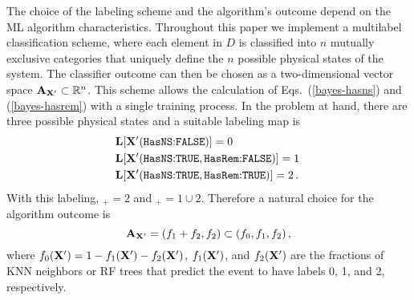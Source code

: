 The choice of the labeling scheme and the algorithm's outcome depend on the \ac{ML} algorithm characteristics. Throughout this paper we implement a multilabel classification scheme, where each
element in $D$ is classified into $n$ mutually exclusive categories that uniquely define the $n$ possible physical states of the system. The classifier outcome can then be chosen as a
two-dimensional vector space ${\bf A}_{{\bf X}'}\subset \mathbb{R}^n$. This scheme allows the calculation of Eqs.~(\ref{bayes-hasns}) and (\ref{bayes-hasrem}) with a single training process. In
the problem at hand, there are three possible physical states and a suitable labeling
map is 
%
\begin{align}
&{\bf L}[{\bf X}'(\hbox{{{\tt HasNS}}:{{\tt FALSE}}})]=0\,\nonumber\\
&{\bf L}[{\bf X}'(\hbox{{{\tt HasNS}}:{{\tt TRUE}}},\hbox{{{\tt HasRem}}:{{\tt FALSE}}})]=1\,\\
&{\bf L}[{\bf X}'(\hbox{{{\tt HasNS}}:{{\tt TRUE}}},\hbox{{{\tt HasRem}}:{{\tt TRUE}}})]=2\,.\nonumber
\end{align}
%
With this labeling, \hasrem$_+=2$ and \hasns$_+=1\cup 2$. Therefore a natural choice for the algorithm outcome is
%
\begin{equation}
{\bf A}_{\bf X'}=(f_1+f_2,f_2)\subset (f_0,f_1,f_2)\,,
\end{equation}
%
where $f_0({\bf X}')=1-f_1({\bf X}')-f_2({\bf X}')$, $f_1({\bf X}')$, and $f_2({\bf X}')$ are the fractions of \ac{KNN} neighbors or \ac{RF} trees that predict the event to
have labels 0, 1, and 2, respectively.

%
%

